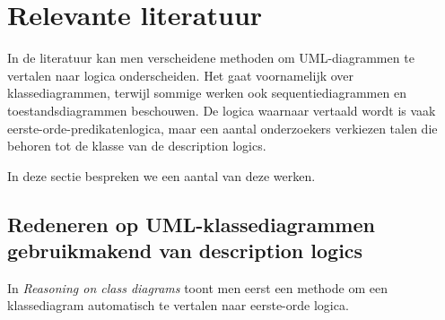 \chapter{Relevante literatuur}
In de literatuur kan men verscheidene methoden om UML-diagrammen te vertalen naar logica onderscheiden. Het gaat voornamelijk over klassediagrammen, terwijl sommige werken ook sequentiediagrammen en toestandsdiagrammen beschouwen. De logica waarnaar vertaald wordt is vaak eerste-orde-predikatenlogica, maar een aantal onderzoekers verkiezen talen die behoren tot de klasse van de description logics.

In deze sectie bespreken we een aantal van deze werken.

\section{Redeneren op UML-klassediagrammen gebruikmakend van description logics}
In \textit{Reasoning on class diagrams} \cite{BerardiDaniela2005RoUc} toont men eerst een methode om een klassediagram automatisch te vertalen naar eerste-orde logica.